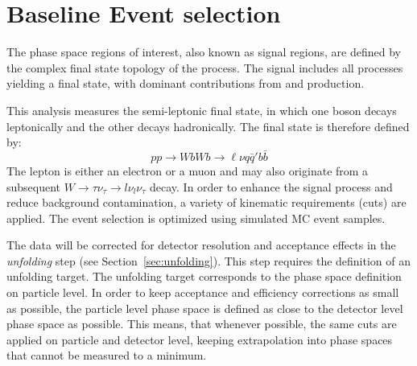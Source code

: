 \section{Baseline Event selection}%
\label{sec:EventSelection}

The phase space regions of interest, also known as signal regions, are defined by the complex final state topology of the \WbWb process.
The signal includes all processes yielding a \WbWb final state, with dominant contributions
from \ttbar and \tW production.

This analysis measures the semi-leptonic final state, in which one \Wboson boson decays leptonically and the other decays hadronically.
The final state is therefore defined by:
\begin{equation*}
    pp \rightarrow WbWb \rightarrow \ell\nu q \bar{q}' b \bar{b}
\end{equation*}
The lepton is either an electron or a muon and may also originate from a subsequent $W\rightarrow\tau\nu_\tau\rightarrow l\nu_l\nu_\tau$ decay.
In order to enhance the signal process and reduce background contamination, a variety of kinematic requirements (cuts) are applied.
The event selection is optimized using simulated MC event samples.

The data will be corrected for detector resolution and acceptance effects in the \textit{unfolding} step (see Section~\ref{sec:unfolding}).
This step requires the definition of an unfolding target.
The unfolding target corresponds to the phase space definition on particle level.
In order to keep acceptance and efficiency corrections as small as possible, the particle level phase space is defined as close to the detector level phase space
as possible. This means, that whenever possible, the same cuts are applied on particle and detector level, keeping
extrapolation into phase spaces that cannot be measured to a minimum.

